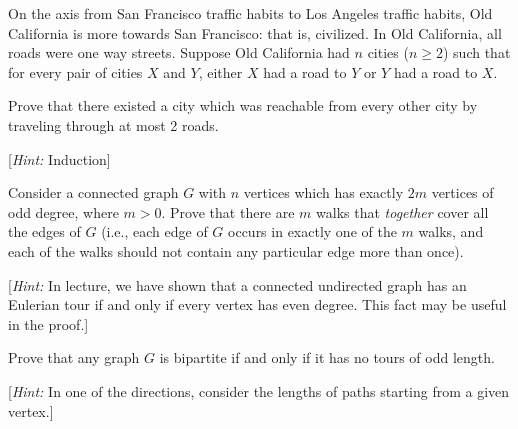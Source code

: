 \documentclass[11pt]{article}
\begin{document}
\begin{Parts}

\Part On the axis from San Francisco traffic habits to Los Angeles traffic habits, Old California is more towards San Francisco: that is, civilized. In Old California, all roads were one way streets. Suppose Old California had 
$n$ cities ($n \geq 2$) such that for every pair of cities $X$ and $Y$,
either $X$ had a road to $Y$ or $Y$ had a road to $X$.

Prove that there existed a city which was reachable from every other city by traveling through at most 2 roads. 

[\textit{Hint:} Induction]

\Part Consider a connected graph $G$ with $n$ vertices which has exactly $2m$ vertices of
odd degree, where $m > 0$. Prove that there are $m$ walks that \emph{together} 
cover all the edges of $G$ (i.e., each edge of $G$ occurs in exactly one of the $m$ walks, 
and each of the walks should not contain any particular edge more than once).

[\emph{Hint:} In lecture, we have shown that a connected undirected graph has an Eulerian tour if and only if every vertex has even degree. This fact may be useful in the proof.]

\Part Prove that any graph $G$ is bipartite if and only if it has no tours of odd length.

[\emph{Hint:} In one of the directions, consider the lengths of paths starting from a given vertex.]
\end{Parts}
\end{document}

